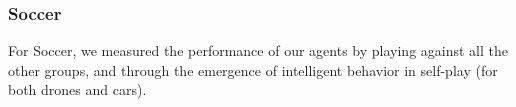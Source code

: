 \documentclass[a4paper,12pt]{article}
\begin{document}
\subsubsection{Soccer}
\label{subsubsec:soccer_results}

For Soccer, we measured the performance of our agents by playing against all the other groups, and through the emergence of intelligent behavior in self-play (for both drones and cars).




  
\end{document}
